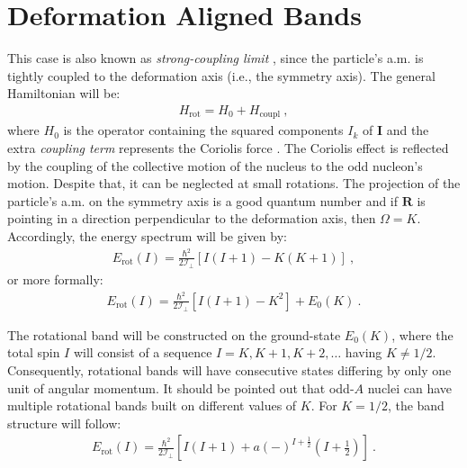 \section{Deformation Aligned Bands}

This case is also known as \emph{strong-coupling limit} \cite{bohr1953collective}, since the particle's a.m. is tightly coupled to the deformation axis (i.e., the symmetry axis). The general Hamiltonian will be:
\begin{align}
    H_\text{rot}=H_0+H_\text{coupl}\ ,
\end{align}
where $H_0$ is the operator containing the squared components $I_k$ of $\mathbf{I}$ and the extra \emph{coupling term} represents the Coriolis force \cite{bertulani2007nuclear}. The Coriolis effect is reflected by the coupling of the collective motion of the nucleus to the odd nucleon's motion. Despite that, it can be neglected at small rotations. The projection of the particle's a.m. on the symmetry axis is a good quantum number and if $\mathbf{R}$ is pointing in a direction perpendicular to the deformation axis, then $\Omega=K$. Accordingly, the energy spectrum will be given by:
\begin{align}
    E_\text{rot}(I)=\frac{\hbar^2}{2\mathcal{I}_\perp}\left[I(I+1)-K(K+1)\right]\ ,
\end{align}
or more formally:
\begin{align}
    E_\text{rot}(I)=\frac{\hbar^2}{2\mathcal{I}_\perp}\left[I(I+1)-K^2\right]+E_0(K)\ .
\end{align}

The rotational band will be constructed on the ground-state $E_0(K)$, where the total spin $I$ will consist of a sequence $I=K,K+1,K+2,\dots$ having $K\neq 1/2$. Consequently, rotational bands will have consecutive states differing by only one unit of angular momentum. It should be pointed out that odd-$A$ nuclei can have multiple rotational bands built on different values of $K$. For $K=1/2$, the band structure will follow:
\begin{align}
    E_\text{rot}(I)=\frac{\hbar^2}{2\mathcal{I}_\perp}\left[I(I+1)+a(-)^{I+\frac{1}{2}}(I+\frac{1}{2})\right]\ .
    \label{deformation-aligned-energy}
\end{align}

